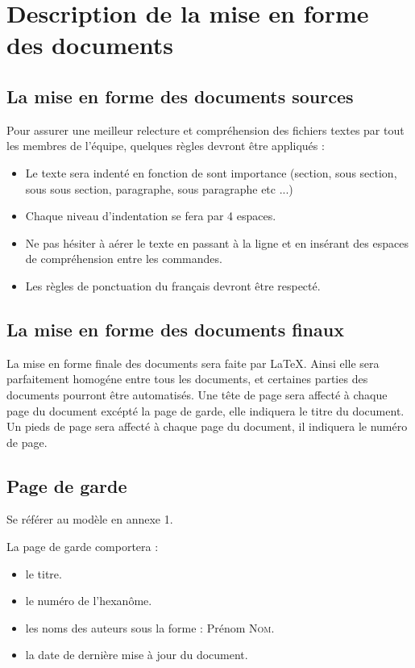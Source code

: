 \section{Description de la mise en forme des documents}

\subsection{La mise en forme des documents sources}
    Pour assurer une meilleur relecture et compréhension des fichiers textes par tout les membres de l'équipe, quelques règles devront être appliqués :
    \begin{itemize}
        \item Le texte sera indenté en fonction de sont importance (section, sous section, sous sous section, paragraphe, sous paragraphe etc ...)
        \item Chaque niveau d'indentation se fera par 4 espaces.
        \item Ne pas hésiter à aérer le texte en passant à la ligne et en insérant des espaces de compréhension entre les commandes.
        \item Les règles de ponctuation du français devront être respecté.
    \end{itemize}

\subsection{La mise en forme des documents finaux}
La mise en forme finale des documents sera faite par LaTeX.
Ainsi elle sera parfaitement homogéne entre tous les documents, et certaines parties des documents pourront être automatisés.
Une tête de page sera affecté à chaque page du document excépté la page de garde, elle indiquera le titre du document.
Un pieds de page sera affecté à chaque page du document, il indiquera le numéro de page.

\subsection{Page de garde}
   Se référer au modèle en annexe 1.

   La page de garde comportera :
   \begin{itemize}
      \item le titre.
      \item le numéro de l'hexanôme.
      \item les noms des auteurs sous la forme : Prénom \textsc{Nom}.
      \item la date de dernière mise à jour du document.
   \end{itemize}


